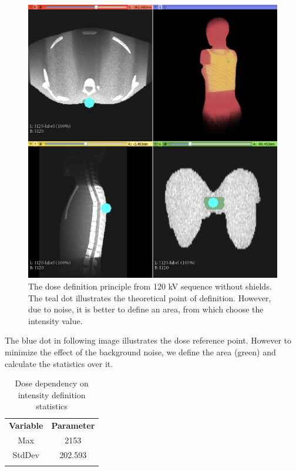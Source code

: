 \documentclass[fleqn,10pt]{SelfArx} %
\begin{document}
\begin{figure}[!htb]\centering
	\includegraphics[width=\linewidth]{DoseIntensityDef}
	\caption{The dose definition principle from 120 kV sequence without shields. The teal dot illustrates the theoretical point of definition. However, due to noise, it is better to define an area, from which choose the intensity value.}
	\label{fig:DoseIntensityDef}
\end{figure}

The blue dot in following image illustrates the dose reference point. However to minimize the effect of the background noise, we define the area (green) and calculate the statistics over it.

\begin{table}[!hbt]
	\caption{Dose dependency on intensity definition statistics}
	\centering
	
	\label{tab:DoseCalculationCoefficient}
	\begin{tabulary}{\linewidth}[hbt]{||c|c||}
		\textbf{Variable} & \textbf{Parameter}\\
		\hhline{|:=|=:|}
		Max &  2153\\
		\hhline{||--||}
		StdDev & 202.593\\
	\end{tabulary}
\end{table}
\end{document}
